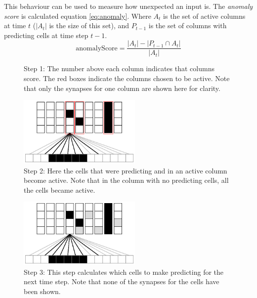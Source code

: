 \documentclass[a4paper]{jpconf}
\begin{document}
		This behaviour can be used to measure how unexpected an input is. The \emph{anomaly score} is calculated equation \ref{eq:anomaly}. Where $A_t$ is the set of active columns at time $t$ ($|A_t|$ is the size of this set), and $P_{t-1}$ is the set of columns with predicting cells at time step $t-1$.
		\begin{equation}\label{eq:anomaly}
		\mathrm{anomalyScore} = \frac{| A_t| - |P_{t-1} \cap A_t |}{|A_t|}
		\end{equation}

\begin{figure}[h]
	\centering
	\hspace{1pc}%
	\begin{minipage}[b]{0.3\textwidth}
	\caption{Step 1: The number above each column indicates that columns score. The red boxes indicate the columns chosen to be active. Note that only the synapses for one column are shown here for clarity.}\label{fig:algorithmDiagramStep1}
	\end{minipage}
\end{figure}

\begin{figure}[h]
	\centering
	\includegraphics[width=0.53\textwidth]{algorithmDiagramStep2.eps}\hspace{1pc}%
	\begin{minipage}[b]{0.3\textwidth}
	\caption{Step 2: Here the cells that were predicting and in an active column become active. Note that in the column with no predicting cells, all the cells became active.}\label{fig:algorithmDiagramStep2}
	\end{minipage}
\end{figure}

\begin{figure}[h]
	\centering
	\includegraphics[width=0.53\textwidth]{algorithmDiagramStep3.eps}\hspace{1pc}%
	\begin{minipage}[b]{0.3\textwidth}
	\caption{Step 3: This step calculates which cells to make predicting for the next time step. Note that none of the synapses for the cells have been shown.}\label{fig:algorithmDiagramStep3}
	\end{minipage}
\end{figure}
\end{document}
